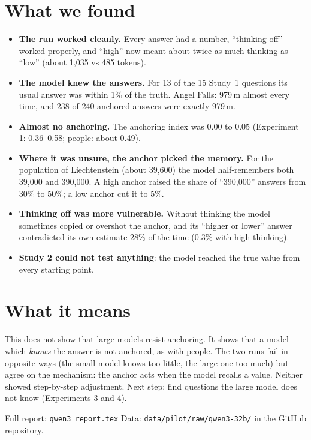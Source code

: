 \documentclass[11pt,a4paper]{article}
\begin{document}
\section*{What we found}
\begin{itemize}[leftmargin=*]
  \item \textbf{The run worked cleanly.} Every answer had a number, \enquote{thinking off} worked properly, and \enquote{high} now meant about twice as much thinking as \enquote{low} (about 1,035 vs 485 tokens).
  \item \textbf{The model knew the answers.} For 13 of the 15 Study~1 questions its usual answer was within 1\% of the truth. Angel Falls: 979\,m almost every time, and 238 of 240 anchored answers were exactly 979\,m.
  \item \textbf{Almost no anchoring.} The anchoring index was 0.00 to 0.05 (Experiment 1: 0.36--0.58; people: about 0.49).
  \item \textbf{Where it was unsure, the anchor picked the memory.} For the population of Liechtenstein (about 39,600) the model half-remembers both 39,000 and 390,000. A high anchor raised the share of \enquote{390,000} answers from 30\% to 50\%; a low anchor cut it to 5\%.
  \item \textbf{Thinking off was more vulnerable.} Without thinking the model sometimes copied or overshot the anchor, and its \enquote{higher or lower} answer contradicted its own estimate 28\% of the time (0.3\% with high thinking).
  \item \textbf{Study 2 could not test anything}: the model reached the true value from every starting point.
\end{itemize}

\section*{What it means}
This does not show that large models resist anchoring. It shows that a model which \emph{knows} the answer is not anchored, as with people. The two runs fail in opposite ways (the small model knows too little, the large one too much) but agree on the mechanism: the anchor acts when the model recalls a value. Neither showed step-by-step adjustment. Next step: find questions the large model does not know (Experiments 3 and 4).

\vfill
{\small Full report: \texttt{qwen3\_report.tex} \textperiodcentered{} Data: \texttt{data/pilot/raw/qwen3-32b/} in the GitHub repository.}
\end{document}
